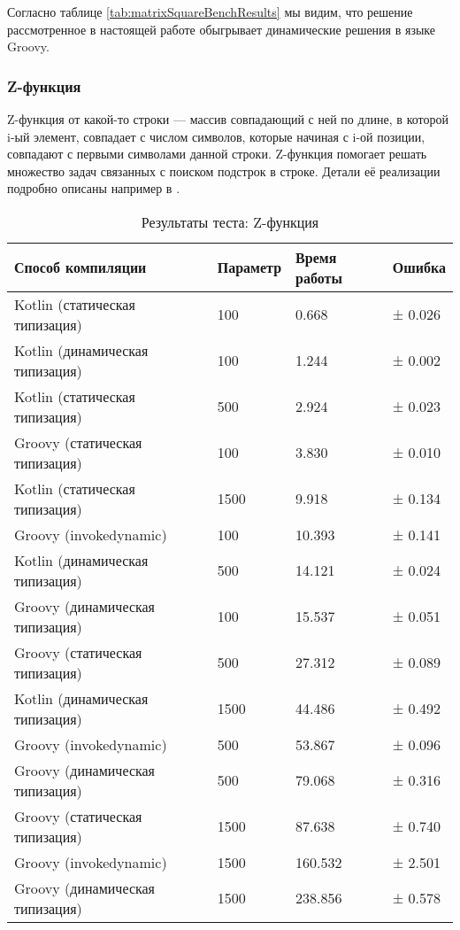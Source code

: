 Согласно таблице \ref{tab:matrixSquareBenchResults} мы видим, что решение рассмотренное в настоящей работе обыгрывает динамические решения в языке Groovy.

\subsubsection{Z-функция}


Z-функция от какой-то строки --- массив совпадающий с ней по длине, в которой i-ый элемент, совпадает с числом символов, которые начиная с i-ой позиции, совпадают с первыми символами данной строки. Z-функция помогает решать множество задач связанных с поиском подстрок в строке.
Детали её реализации подробно описаны например в \cite{algo:gusfield1997algorithms}.

\begin{table}[h]
\caption{\label{tab:zFunctionBenchResults}Результаты теста: Z-функция}
\begin{center}
\begin{tabular}{|l|l|l|l|}
\hline
Способ компиляции & Параметр	& Время работы & Ошибка \\
\hline
Kotlin (статическая типизация)              &  100  &   0.668 & ± 0.026 \\
Kotlin (динамическая типизация)             &  100  &   1.244 & ± 0.002 \\
Kotlin (статическая типизация)              &  500  &   2.924 & ± 0.023 \\
Groovy (статическая типизация)              &  100  &   3.830 & ± 0.010 \\
Kotlin (статическая типизация)              & 1500  &   9.918 & ± 0.134 \\
Groovy (invokedynamic)                      &  100  &  10.393 & ± 0.141 \\
Kotlin (динамическая типизация)             &  500  &  14.121 & ± 0.024 \\
Groovy (динамическая типизация)             &  100  &  15.537 & ± 0.051 \\
Groovy (статическая типизация)              &  500  &  27.312 & ± 0.089 \\
Kotlin (динамическая типизация)             & 1500  &  44.486 & ± 0.492 \\
Groovy (invokedynamic)                      &  500  &  53.867 & ± 0.096 \\
Groovy (динамическая типизация)             &  500  &  79.068 & ± 0.316 \\
Groovy (статическая типизация)              & 1500  &  87.638 & ± 0.740 \\
Groovy (invokedynamic)                      & 1500  & 160.532 & ± 2.501 \\
Groovy (динамическая типизация)             & 1500  & 238.856 & ± 0.578 \\
\hline
\end{tabular}
\end{center}
\end{table} 

